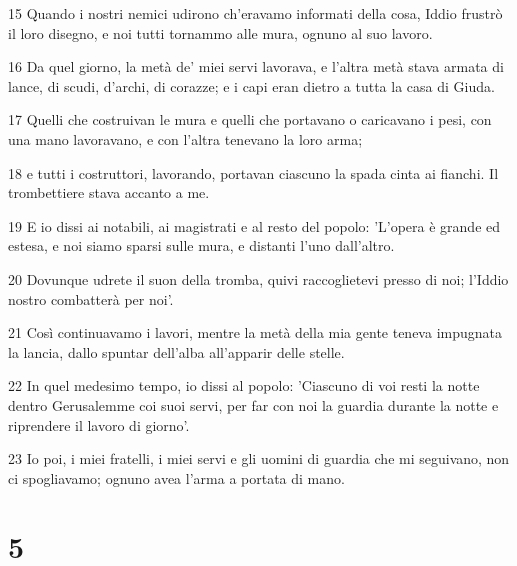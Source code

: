 \par 15 Quando i nostri nemici udirono ch'eravamo informati della cosa, Iddio frustrò il loro disegno, e noi tutti tornammo alle mura, ognuno al suo lavoro.
\par 16 Da quel giorno, la metà de' miei servi lavorava, e l'altra metà stava armata di lance, di scudi, d'archi, di corazze; e i capi eran dietro a tutta la casa di Giuda.
\par 17 Quelli che costruivan le mura e quelli che portavano o caricavano i pesi, con una mano lavoravano, e con l'altra tenevano la loro arma;
\par 18 e tutti i costruttori, lavorando, portavan ciascuno la spada cinta ai fianchi. Il trombettiere stava accanto a me.
\par 19 E io dissi ai notabili, ai magistrati e al resto del popolo: 'L'opera è grande ed estesa, e noi siamo sparsi sulle mura, e distanti l'uno dall'altro.
\par 20 Dovunque udrete il suon della tromba, quivi raccoglietevi presso di noi; l'Iddio nostro combatterà per noi'.
\par 21 Così continuavamo i lavori, mentre la metà della mia gente teneva impugnata la lancia, dallo spuntar dell'alba all'apparir delle stelle.
\par 22 In quel medesimo tempo, io dissi al popolo: 'Ciascuno di voi resti la notte dentro Gerusalemme coi suoi servi, per far con noi la guardia durante la notte e riprendere il lavoro di giorno'.
\par 23 Io poi, i miei fratelli, i miei servi e gli uomini di guardia che mi seguivano, non ci spogliavamo; ognuno avea l'arma a portata di mano.

\chapter{5}

